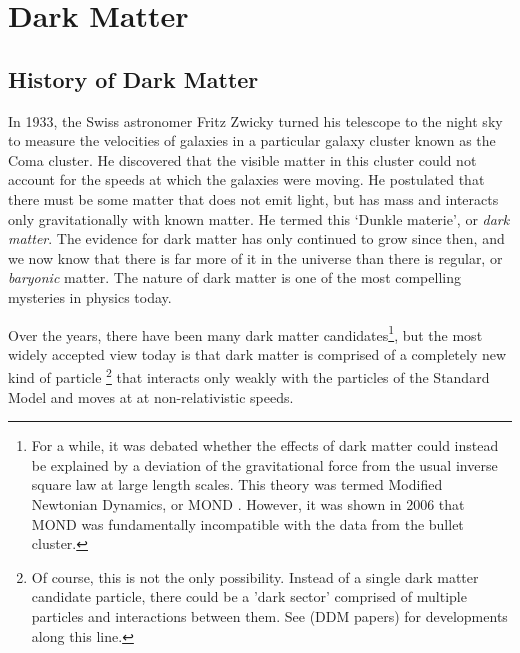 \section{Dark Matter}\label{sec:dark_matter}
\subsection{History of Dark Matter}\label{subsec:history-of-dark-matter}

In 1933, the Swiss astronomer Fritz Zwicky turned his telescope to the night sky to measure the velocities of galaxies in a particular galaxy cluster known as the Coma cluster. He discovered that the visible matter in this cluster could not account for the speeds at which the galaxies were moving. He postulated that there must be some matter that does not emit light, but has mass and interacts only gravitationally with known matter. He termed this `Dunkle materie', or \emph{dark matter}. The evidence for dark matter has only continued to grow since then, and we now know that there is far more of it in the universe than there is regular, or \emph{baryonic} matter. The nature of dark matter is one of the most compelling mysteries in physics today.

Over the years, there have been many dark matter candidates\footnote{For a while, it was debated whether the effects of dark matter could instead be explained by a deviation of the gravitational force from the usual inverse square law at large length scales. This theory was termed Modified Newtonian Dynamics, or MOND \citep{Milgrom1983}. However, it was shown in 2006 \citep{Clowe2006} that MOND was fundamentally incompatible with the data from the bullet cluster.}, but the most widely accepted view today is that dark matter is comprised of a completely new kind of particle \footnote{Of course, this is not the only possibility. Instead of a single dark matter candidate particle, there could be a 'dark sector' comprised of multiple particles and interactions between them. See (DDM papers) for developments along this line.} that interacts only weakly with the particles of the Standard Model and moves at at non-relativistic speeds.

